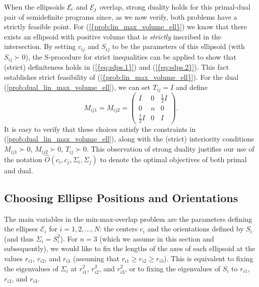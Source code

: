 \documentclass{siamltex}
\begin{document}
When the ellipsoids ${\cal E}_i$ and ${\cal E}_j$ overlap, strong
duality holds for this primal-dual pair of semidefinite programs
since, as we now verify, both problems have a strictly feasible point.
For {(\ref{{prob:lin_max_volume_ell}})} we know that there exists an
ellipsoid with positive volume that is {\em strictly} inscribed in the
intersection. By setting $c_{ij}$ and $S_{ij}$ to be the parameters of
this ellipsoid (with $S_{ij} \succ 0$), the S-procedure for strict
inequalities can be applied to show that (strict) definiteness holds
in {(\ref{{eq:sdps.1}})} and {(\ref{{eq:sdps.2}})}. This fact establishes
strict feasibility of {(\ref{{prob:lin_max_volume_ell}})}. For the dual
(\ref{prob:dual_lin_max_volume_ell}), we can set $T_{ij}=I$ and define
\[
M_{ij1} = M_{ij2} = \begin{pmatrix}  I &0& \frac{1}{2}I\\0& n &0\\ \frac{1}{2}I&0&I\end{pmatrix}.
\]
It is easy to verify that these choices satisfy the constraints in
(\ref{prob:dual_lin_max_volume_ell}), along with the (strict)
interiority conditions $M_{ij1} \succ 0$, $M_{ij2} \succ 0$, $T_{ij}
\succ 0$.  This observation of strong duality justifies our use of the
notation $\hat{O} (c_i,c_j,\Sigma_i,\Sigma_j)$ to denote the optimal
objectives of both primal and dual.

 

\subsection{Choosing Ellipse Positions and Orientations}
\label{sec:positioning}

The main variables in the min-max-overlap problem are the parameters
defining the ellipses $\mathcal{E}_i$ for $i=1,2,\dotsc,N$: the
centers $c_i$ and the orientations defined by $S_i$ (and thus
$\Sigma_i = S_i^2$).  For $n=3$ (which we assume in this section and
subsequently), we would like to fix the lengths of the axes of each
ellipsoid at the values $r_{i1}$, $r_{i2}$, and $r_{i3}$ (assuming
that $r_{i1}\geq r_{i2}\geq r_{i3}$). This is equivalent to fixing the
eigenvalues of $\Sigma_i$ at $r_{i1}^2$, $r_{i2}^2$, and $r_{i3}^2$,
or to fixing the eigenvalues of $S_i$ to $r_{i1}$, $r_{i2}$, and
$r_{i3}$.
\end{document}
